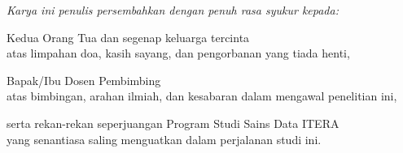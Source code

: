 \vfill
\begin{center}
  \itshape
  Karya ini penulis persembahkan dengan penuh rasa syukur kepada:\par
  \medskip
  Kedua Orang Tua dan segenap keluarga tercinta\\
  atas limpahan doa, kasih sayang, dan pengorbanan yang tiada henti,\par
  \medskip
  Bapak/Ibu Dosen Pembimbing\\
  atas bimbingan, arahan ilmiah, dan kesabaran dalam mengawal penelitian ini,\par
  \medskip
  serta rekan-rekan seperjuangan Program Studi Sains Data ITERA\\
  yang senantiasa saling menguatkan dalam perjalanan studi ini.\par
\end{center}
\vfill
\clearpage
